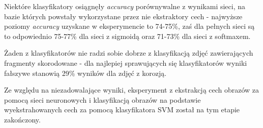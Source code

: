 \documentclass[polish,12pt]{aghthesis}
\begin{document}
\par Niektóre klasyfikatory osiągnęły \textit{accuracy} porównywalne z wynikami sieci, na bazie których powstały wykorzystane przez nie ekstraktory cech - najwyższe poziomy \textit{accuracy} uzyskane w eksperymencie to 74-75\%, zaś dla pełnych sieci są to odpowiednio 75-77\% dla sieci z sigmoidą oraz 71-73\% dla sieci z softmaxem. 
\par Żaden z klasyfikatorów nie radzi sobie dobrze z klasyfikacją zdjęć zawierających fragmenty skorodowane - dla najlepiej sprawujących się klasyfikatorów wyniki fałszywe stanowią 29\% wyników dla zdjęć z korozją.
\par Ze względu na niezadowalające wyniki, eksperyment z ekstrakcją cech obrazów za pomocą sieci neuronowych i klasyfikacją obrazów na podstawie wyekstrahowanych cech za pomocą klasyfikatora SVM został na tym etapie zakończony.
\end{document}
